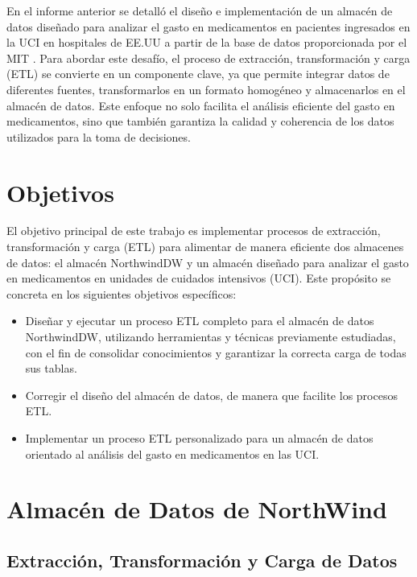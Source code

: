 \documentclass{article}
\begin{document}
En el informe anterior se detalló el diseño e implementación de un almacén de datos diseñado para analizar el gasto en medicamentos en pacientes ingresados en la UCI en hospitales de EE.UU a partir de la base de datos proporcionada por el MIT \cite{eicu_crd}. Para abordar este desafío, el proceso de extracción, transformación y carga (ETL) se convierte en un componente clave, ya que permite integrar datos de diferentes fuentes, transformarlos en un formato homogéneo y almacenarlos en el almacén de datos. Este enfoque no solo facilita el análisis eficiente del gasto en medicamentos, sino que también garantiza la calidad y coherencia de los datos utilizados para la toma de decisiones.

\section{Objetivos}
\label{sec:objetivos}

El objetivo principal de este trabajo es implementar procesos de extracción, transformación y carga (ETL) para alimentar de manera eficiente dos almacenes de datos: el almacén NorthwindDW y un almacén diseñado para analizar el gasto en medicamentos en unidades de cuidados intensivos (UCI). Este propósito se concreta en los siguientes objetivos específicos:

\begin{itemize}
	\item Diseñar y ejecutar un proceso ETL completo para el almacén de datos NorthwindDW, utilizando herramientas y técnicas previamente estudiadas, con el fin de consolidar conocimientos y garantizar la correcta carga de todas sus tablas.
	\item Corregir el diseño del almacén de datos, de manera que facilite los procesos ETL.
	\item Implementar un proceso ETL personalizado para un almacén de datos orientado al análisis del gasto en medicamentos en las UCI.
	
\end{itemize}

\section{Almacén de Datos de NorthWind}

\subsection{Extracción, Transformación y Carga de Datos}
\end{document}
